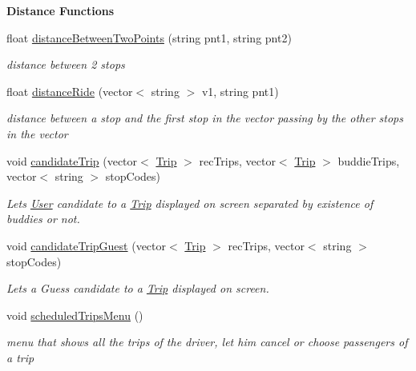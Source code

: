 \begin{Indent}\textbf{ Distance Functions}\par
\begin{DoxyCompactItemize}
\item 
float \hyperlink{class_agency_a4efd6041c1293f0366b76356c05e3520}{distance\+Between\+Two\+Points} (string pnt1, string pnt2)
\begin{DoxyCompactList}\small\item\em distance between 2 stops \end{DoxyCompactList}\item 
float \hyperlink{class_agency_a4a3c0e75130deeba5f9fe8dc4cec0468}{distance\+Ride} (vector$<$ string $>$ v1, string pnt1)
\begin{DoxyCompactList}\small\item\em distance between a stop and the first stop in the vector passing by the other stops in the vector \end{DoxyCompactList}\item 
void \hyperlink{class_agency_a51d72590b842d0df300cd39846353f00}{candidate\+Trip} (vector$<$ \hyperlink{class_trip}{Trip} $>$ rec\+Trips, vector$<$ \hyperlink{class_trip}{Trip} $>$ buddie\+Trips, vector$<$ string $>$ stop\+Codes)
\begin{DoxyCompactList}\small\item\em Lets \hyperlink{class_user}{User} candidate to a \hyperlink{class_trip}{Trip} displayed on screen separated by existence of buddies or not. \end{DoxyCompactList}\item 
void \hyperlink{class_agency_a55ae3f0e58a987ab17bd7dd358add125}{candidate\+Trip\+Guest} (vector$<$ \hyperlink{class_trip}{Trip} $>$ rec\+Trips, vector$<$ string $>$ stop\+Codes)
\begin{DoxyCompactList}\small\item\em Lets a Guess candidate to a \hyperlink{class_trip}{Trip} displayed on screen. \end{DoxyCompactList}\item 
\mbox{\label{class_agency_a83b9652dad153b729c19f3413620908a}} 
void \hyperlink{class_agency_a83b9652dad153b729c19f3413620908a}{scheduled\+Trips\+Menu} ()
\begin{DoxyCompactList}\small\item\em menu that shows all the trips of the driver, let him cancel or choose passengers of a trip \end{DoxyCompactList}\end{DoxyCompactItemize}
\end{Indent}
